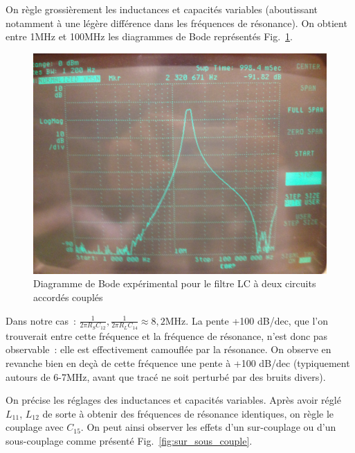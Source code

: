 \documentclass{article}
\begin{document}
On règle grossièrement les inductances et capacités variables (aboutissant notamment à une légère différence dans les fréquences de résonance). On obtient entre 1MHz et 100MHz les diagrammes de Bode représentés Fig.~\ref{fig:LC2plot}.

\begin{figure}[h]
	\centering
	\includegraphics[width=.5\textwidth]{1MHz_100MHz}
	\caption{Diagramme de Bode expérimental pour le filtre LC à deux circuits accordés couplés}
	\label{fig:LC2plot}
\end{figure}

Dans notre cas~: ${\frac{1}{2\pi R_S C_{12}}, \frac{1}{2\pi R_L C_{14}}\approx 8,2\mathrm{MHz}}$. La pente +100 dB/dec, que l'on trouverait entre cette fréquence et la fréquence de résonance, n'est donc pas observable~: elle est effectivement camouflée par la résonance. On observe en revanche bien en deçà de cette fréquence une pente à +100 dB/dec (typiquement autours de 6-7MHz, avant que tracé ne soit perturbé par des bruits divers).



On précise les réglages des inductances et capacités variables. Après avoir réglé $L_{11}$, $L_{12}$ de sorte à obtenir des fréquences de résonance identiques, on règle le couplage avec $C_{15}$. On peut ainsi observer les effets d'un sur-couplage ou d'un sous-couplage comme présenté Fig.~\ref{fig:sur_sous_couple}.
\end{document}
